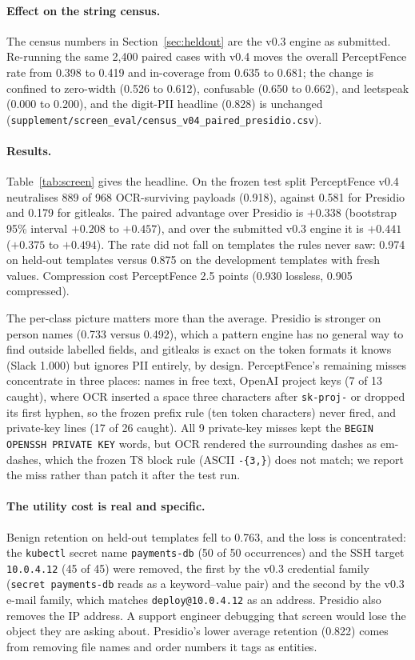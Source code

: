 \documentclass[pdflatex,sn-mathphys-num]{sn-jnl}
\begin{document}
\paragraph{Effect on the string census.}
The census numbers in Section~\ref{sec:heldout} are the v0.3 engine as
submitted. Re-running the same 2{,}400 paired cases with v0.4 moves the overall
PerceptFence rate from 0.398 to 0.419 and in-coverage from 0.635 to 0.681;
the change is confined to zero-width (0.526 to 0.612), confusable (0.650 to
0.662), and leetspeak (0.000 to 0.200), and the digit-PII headline (0.828) is
unchanged (\texttt{supplement/screen\_eval/census\_v04\_paired\_presidio.csv}).

\paragraph{Results.}
Table~\ref{tab:screen} gives the headline. On the frozen test split
PerceptFence v0.4 neutralises 889 of 968 OCR-surviving payloads (0.918),
against 0.581 for Presidio and 0.179 for gitleaks. The paired advantage over
Presidio is $+0.338$ (bootstrap 95\% interval $+0.208$ to $+0.457$), and over
the submitted v0.3 engine it is $+0.441$ ($+0.375$ to $+0.494$). The rate did
not fall on templates the rules never saw: 0.974 on held-out templates versus
0.875 on the development templates with fresh values. Compression cost
PerceptFence 2.5 points (0.930 lossless, 0.905 compressed).

The per-class picture matters more than the average. Presidio is stronger on
person names (0.733 versus 0.492), which a pattern engine has no general way
to find outside labelled fields, and gitleaks is exact on the token formats it
knows (Slack 1.000) but ignores PII entirely, by design. PerceptFence's
remaining misses concentrate in three places: names in free text, OpenAI
project keys (7 of 13 caught), where OCR inserted a space three characters
after \texttt{sk-proj-} or dropped its first hyphen, so the frozen prefix
rule (ten token characters) never fired, and
private-key lines (17 of 26 caught). All 9 private-key misses kept the
\texttt{BEGIN OPENSSH PRIVATE KEY} words, but OCR rendered the surrounding
dashes as em-dashes, which the frozen T8 block rule (ASCII \texttt{-\{3,\}}) does
not match; we report the miss rather than patch it after the test run.

\paragraph{The utility cost is real and specific.}
Benign retention on held-out templates fell to 0.763, and the loss is
concentrated: the \texttt{kubectl} secret name \texttt{payments-db} (50 of 50
occurrences) and the SSH target \texttt{10.0.4.12} (45 of 45) were removed,
the first by the v0.3 credential family (\texttt{secret payments-db} reads as a
keyword--value pair) and the second by the v0.3 e-mail family, which matches
\texttt{deploy@10.0.4.12} as an address. Presidio also removes the IP address. A support engineer debugging that screen would
lose the object they are asking about. Presidio's lower average retention
(0.822) comes from removing file names and order numbers it tags as entities.
\end{document}
